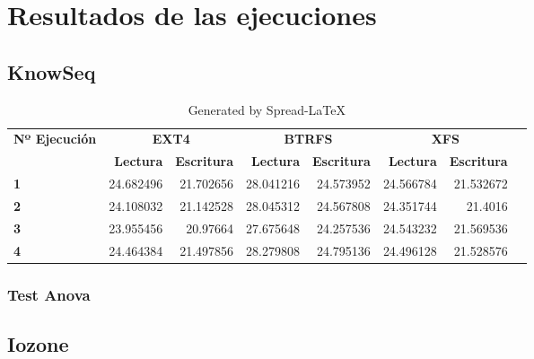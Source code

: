 \chapter{Resultados de las ejecuciones}
\section{KnowSeq}\label{resultados_knowseq}

\begin{table}[!htp]\centering
\caption{Generated by Spread-LaTeX}\label{tab: }
\scriptsize
\begin{tabular}{lrrrrrrr}\toprule
\textbf{Nº Ejecución} &\multicolumn{2}{c}{\textbf{EXT4}} &\multicolumn{2}{c}{\textbf{BTRFS}} &\multicolumn{2}{c}{\textbf{XFS}} \\\cmidrule{1-7}
&\textbf{Lectura} &\textbf{Escritura} &\textbf{Lectura} &\textbf{Escritura} &\textbf{Lectura} &\textbf{Escritura} \\\midrule
\textbf{1} &24.682496 &21.702656 &28.041216 &24.573952 &24.566784 &21.532672 \\
\textbf{2} &24.108032 &21.142528 &28.045312 &24.567808 &24.351744 &21.4016 \\
\textbf{3} &23.955456 &20.97664 &27.675648 &24.257536 &24.543232 &21.569536 \\
\textbf{4} &24.464384 &21.497856 &28.279808 &24.795136 &24.496128 &21.528576 \\
\bottomrule
\end{tabular}
\end{table}



\subsection{Test Anova}

\section{Iozone}

